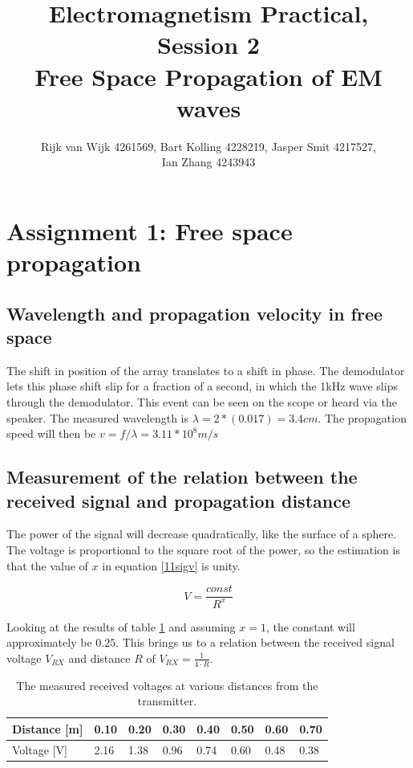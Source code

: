 \documentclass{article}
\title{Electromagnetism Practical, Session 2\\Free Space Propagation of EM waves}
\author{Rijk van Wijk 4261569, Bart Kolling 4228219, Jasper Smit 4217527,\\ Ian Zhang 4243943}
\begin{document}
\maketitle

\newpage

\section{Assignment 1: Free space propagation}

	\subsection{Wavelength and propagation velocity in free space}
		The shift in position of the array translates to a shift in phase.
		The demodulator lets this phase shift slip for a fraction of a second, in which the 1kHz wave slips through the demodulator.
		This event can be seen on the scope or heard via the speaker.
		\newline
		The measured wavelength is $\lambda = 2*(0.017) = 3.4 cm$.
		The propagation speed will then be $v = f/\lambda = 3.11*10^8 m/s$

	\subsection{Measurement of the relation between the received signal and propagation distance}
		The power of the signal will decrease quadratically, like the surface of a sphere. 
		The voltage is proportional to the square root of the power, so the estimation is that the value of $x$ in equation \ref{11sigv} is unity.

		\begin{equation}
		\label{11sigv}
			V = \frac{const}{R^x}
		\end{equation}

		Looking at the results of table \ref{11vrx} and assuming $x = 1$, the constant will approximately be $0.25$.
		This brings us to a relation between the received signal voltage $V_{RX}$ and distance $R$ of $V_{RX} = \frac{1}{4\cdot R}$.


		\begin{table}[H]
			\centering
			\begin{tabular}{l|lllllll}
				Distance {[}m{]} & 0.10 & 0.20 & 0.30 & 0.40 & 0.50 & 0.60 & 0.70 \\ \hline
				Voltage {[}V{]}  & 2.16 & 1.38 & 0.96 & 0.74 & 0.60 & 0.48 & 0.38
			\end{tabular}
			\caption{The measured received voltages at various distances from the transmitter.}
			\label{11vrx}
		\end{table}
\end{document}
